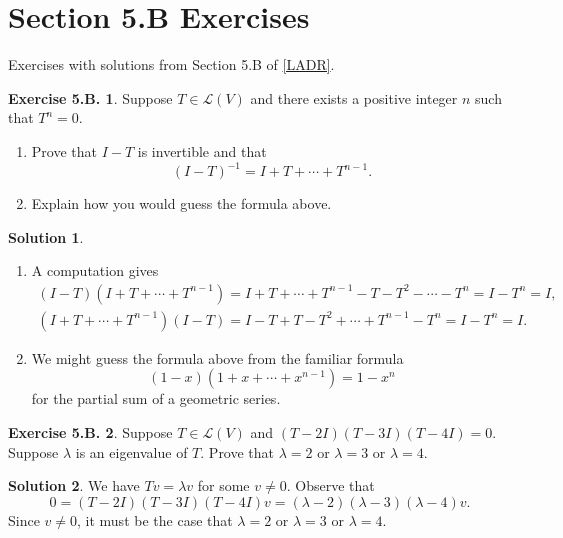 \documentclass[12pt]{article}
\theoremstyle{definition}
\theoremstyle{exercise}
\newtheorem{exercise}{Exercise 5.B.}
\theoremstyle{solution}
\newtheorem*{solution}{Solution}
\newcommand{\lmap}{\mathcal{L}}
\begin{document}
\section{Section 5.B Exercises}

Exercises with solutions from Section 5.B of \hyperlink{ladr}{[LADR]}.

\begin{exercise}
\label{ex:1}
    Suppose \( T \in \lmap(V) \) and there exists a positive integer \( n \) such that \( T^n = 0 \).
    \begin{enumerate}
        \item Prove that \( I - T \) is invertible and that
        \[
            (I - T)^{-1} = I + T + \cdots + T^{n-1}.
        \]

        \item Explain how you would guess the formula above.
    \end{enumerate}
\end{exercise}

\begin{solution}
    \begin{enumerate}
        \item A computation gives
        \begin{gather*}
            (I - T)(I + T + \cdots + T^{n-1}) = I + T + \cdots + T^{n-1} - T - T^2 - \cdots - T^n = I - T^n = I, \\[2mm]
            (I + T + \cdots + T^{n-1})(I - T) = I - T + T - T^2 + \cdots + T^{n-1} - T^n = I - T^n = I.
        \end{gather*}

        \item We might guess the formula above from the familiar formula
        \[
            (1 - x)(1 + x + \cdots + x^{n-1}) = 1 - x^n
        \]
        for the partial sum of a geometric series.
    \end{enumerate}
\end{solution}

\begin{exercise}
\label{ex:2}
    Suppose \( T \in \lmap(V) \) and \( (T - 2I)(T - 3I)(T - 4I) = 0 \). Suppose \( \lambda \) is an eigenvalue of \( T \). Prove that \( \lambda = 2 \) or \( \lambda = 3 \) or \( \lambda = 4 \).
\end{exercise}

\begin{solution}
    We have \( Tv = \lambda v \) for some \( v \neq 0 \). Observe that
    \[
        0 = (T - 2I)(T - 3I)(T - 4I)v = (\lambda - 2)(\lambda - 3)(\lambda - 4)v.
    \]
    Since \( v \neq 0 \), it must be the case that \( \lambda = 2 \) or \( \lambda = 3 \) or \( \lambda = 4 \).
\end{solution}
\end{document}
